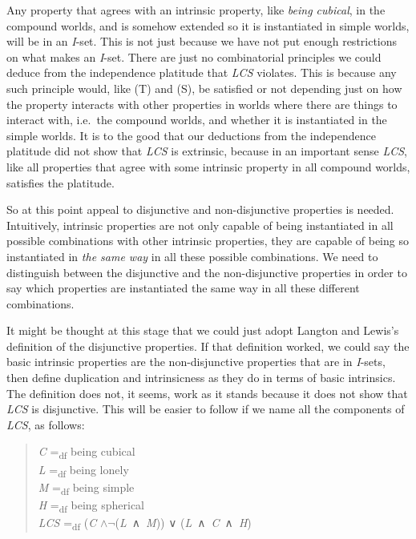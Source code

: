 \documentclass[
  11pt,
  letterpaper,
  DIV=11,
  numbers=noendperiod,
  twoside]{scrartcl}
\begin{document}
Any property that agrees with an intrinsic property, like \emph{being
cubical}, in the compound worlds, and is somehow extended so it is
instantiated in simple worlds, will be in an \emph{I}-set. This is not
just because we have not put enough restrictions on what makes an
\emph{I}-set. There are just no combinatorial principles we could deduce
from the independence platitude that \emph{LCS} violates. This is
because any such principle would, like (T) and (S), be satisfied or not
depending just on how the property interacts with other properties in
worlds where there are things to interact with, i.e.~the compound
worlds, and whether it is instantiated in the simple worlds. It is to
the good that our deductions from the independence platitude did not
show that \emph{LCS} is extrinsic, because in an important sense
\emph{LCS}, like all properties that agree with some intrinsic property
in all compound worlds, satisfies the platitude.

So at this point appeal to disjunctive and non-disjunctive properties is
needed. Intuitively, intrinsic properties are not only capable of being
instantiated in all possible combinations with other intrinsic
properties, they are capable of being so instantiated in \emph{the same
way} in all these possible combinations. We need to distinguish between
the disjunctive and the non-disjunctive properties in order to say which
properties are instantiated the same way in all these different
combinations.

It might be thought at this stage that we could just adopt Langton and
Lewis's definition of the disjunctive properties. If that definition
worked, we could say the basic intrinsic properties are the
non-disjunctive properties that are in \emph{I}-sets, then define
duplication and intrinsicness as they do in terms of basic intrinsics.
The definition does not, it seems, work as it stands because it does not
show that \emph{LCS} is disjunctive. This will be easier to follow if we
name all the components of \emph{LCS}, as follows:

\begin{quote}
\emph{C} =\textsubscript{df} being cubical\\
\emph{L} =\textsubscript{df} being lonely\\
\emph{M} =\textsubscript{df} being simple\\
\emph{H} =\textsubscript{df} being spherical\\
\emph{LCS} =\textsubscript{df} (\emph{C}
\(\wedge \neg\)(\emph{L}~∧~\emph{M})) ∨ (\emph{L}~∧~\emph{C}~∧~\emph{H})
\end{quote}
\end{document}
